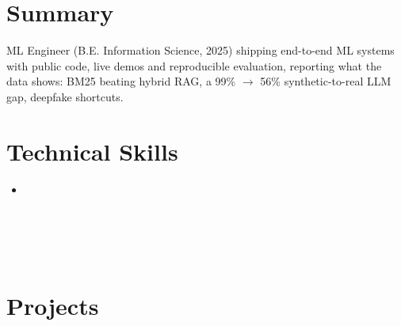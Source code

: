






\section{Summary}
\small{ML Engineer (B.E. Information Science, 2025) shipping end-to-end ML systems with public code, live demos and reproducible evaluation, reporting what the data shows: BM25 beating hybrid RAG, a 99\% $\rightarrow$ 56\% synthetic-to-real LLM gap, deepfake shortcuts.}

\section{Technical Skills}
 \begin{itemize}[leftmargin=0.15in, label={}]
    \item \small{
     \skillLang \\
     \skillML \\
     \skillLLM \\
     \skillMLOps \\
     \skillEval \\
     \skillData
    }
 \end{itemize}
 \vspace{-14pt}



\section{Projects}
  \resumeSubHeadingListStart

    

    

    

    

    

  \resumeSubHeadingListEnd







